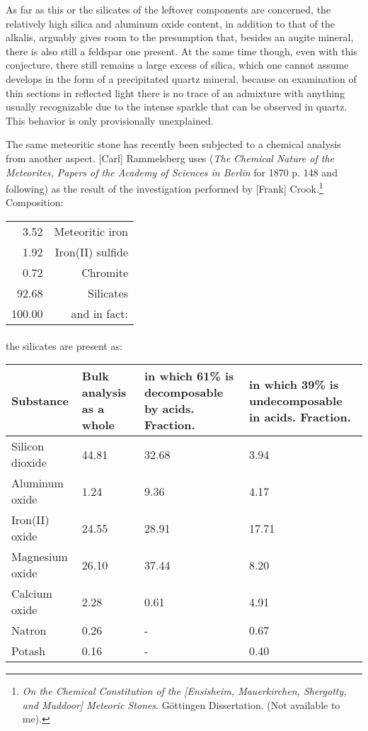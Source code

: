 \documentclass[a4paper, 12pt, oneside]{article}
\begin{document}
As far as this or the silicates of the leftover components are concerned, the relatively high silica and aluminum oxide content, in addition to that of the alkalis, arguably gives room to the presumption that, besides an augite mineral, there is also still a feldspar one present. At the same time though, even with this conjecture, there still remains a large excess of silica, which one cannot assume develops in the form of a precipitated quartz mineral, because on examination of thin sections in reflected light there is no trace of an admixture with anything usually recognizable due to the intense sparkle that can be observed in quartz. This behavior is only provisionally unexplained.

The same meteoritic stone has recently been subjected to a chemical analysis from another aspect. [Carl] Rammelsberg uses (\emph{The Chemical Nature of the Meteorites, Papers of the Academy of Sciences in Berlin} for 1870 p. 148 and following) as the result of the investigation performed by [Frank] Crook.\footnote{\emph{On the Chemical Constitution of the [Ensisheim, Mauerkirchen, Shergotty, and Muddoor] Meteoric Stones}. Göttingen Dissertation. (Not available to me).} Composition:
\begin{center}
    \begin{tabular}{r r}
        3.52 & Meteoritic iron\\
        1.92 & Iron(II) sulfide\\
        0.72 & Chromite\\
        92.68 & Silicates\\
        100.00 & and in fact:\\
    \end{tabular}
\end{center}
\paragraph{}
the silicates are present as:
\begin{center}
    \begin{tabular}{ |l|p{1.5cm}|p{3.2cm}|p{2.9cm}| }
        \hline
        Substance & Bulk analysis as a whole & in which 61\% is decomposable by acids. Fraction. & in which 39\% is undecomposable in acids. Fraction.\\\hline
        Silicon dioxide & 44.81 & 32.68 & 3.94\\\hline
        Aluminum oxide & 1.24 & 9.36 & 4.17\\\hline
        Iron(II) oxide & 24.55 & 28.91 & 17.71\\\hline
        Magnesium oxide & 26.10 & 37.44 & 8.20\\\hline
        Calcium oxide & 2.28 & 0.61 & 4.91\\\hline
        Natron & 0.26 & - & 0.67\\\hline
        Potash & 0.16 & - & 0.40\\
        \hline
    \end{tabular}
\end{center}
\end{document}
